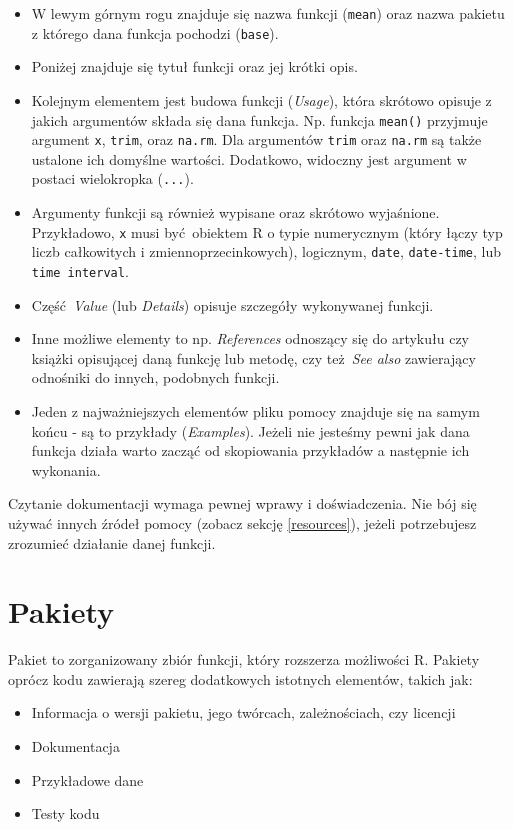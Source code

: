 \documentclass[paper=6in:9in,pagesize=pdftex,headinclude=on,footinclude=on,10pt]{scrbook}
\providecommand{\tightlist}{%
  \setlength{\itemsep}{0pt}\setlength{\parskip}{0pt}}
\begin{document}
\begin{itemize}
\tightlist
\item
  W lewym górnym rogu znajduje się nazwa funkcji (\texttt{mean}) oraz nazwa pakietu z którego dana funkcja pochodzi (\texttt{base}).
\item
  Poniżej znajduje się tytuł funkcji oraz jej krótki opis.
\item
  Kolejnym elementem jest budowa funkcji (\emph{Usage}), która skrótowo opisuje z jakich argumentów składa się dana funkcja.
  Np. funkcja \texttt{mean()} przyjmuje argument \texttt{x}, \texttt{trim}, oraz \texttt{na.rm}.
  Dla argumentów \texttt{trim} oraz \texttt{na.rm} są także ustalone ich domyślne wartości.
  Dodatkowo, widoczny jest argument w postaci wielokropka (\texttt{...}).
\item
  Argumenty funkcji są również wypisane oraz skrótowo wyjaśnione.
  Przykładowo, \texttt{x} musi być~obiektem R o typie numerycznym (który łączy typ liczb całkowitych i zmiennoprzecinkowych), logicznym, \texttt{date}, \texttt{date-time}, lub \texttt{time\ interval}.
\item
  Część~\emph{Value} (lub \emph{Details}) opisuje szczegóły wykonywanej funkcji.
\item
  Inne możliwe elementy to np. \emph{References} odnoszący się do artykułu czy książki opisującej daną funkcję lub metodę, czy też~\emph{See also} zawierający odnośniki do innych, podobnych funkcji.
\item
  Jeden z najważniejszych elementów pliku pomocy znajduje się na samym końcu - są to przykłady (\emph{Examples}).
  Jeżeli nie jesteśmy pewni jak dana funkcja działa warto zacząć od skopiowania przykładów a następnie ich wykonania.
\end{itemize}

Czytanie dokumentacji wymaga pewnej wprawy i doświadczenia.
Nie bój się używać innych źródeł pomocy (zobacz sekcję \ref{resources}), jeżeli potrzebujesz zrozumieć działanie danej funkcji.

\hypertarget{pakiety}{%
\section{Pakiety}\label{pakiety}}

Pakiet to zorganizowany zbiór funkcji, który rozszerza możliwości R.
Pakiety oprócz kodu zawierają szereg dodatkowych istotnych elementów, takich jak:

\begin{itemize}
\tightlist
\item
  Informacja o wersji pakietu, jego twórcach, zależnościach, czy licencji
\item
  Dokumentacja
\item
  Przykładowe dane
\item
  Testy kodu
\end{itemize}
\end{document}
